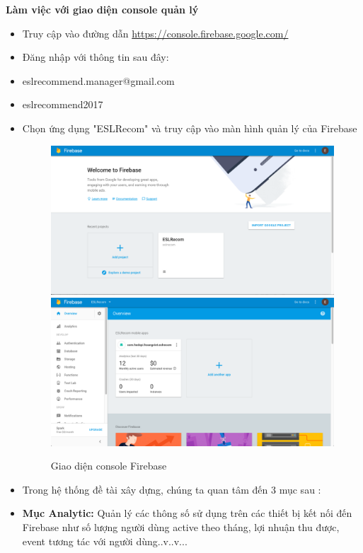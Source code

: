 {\Large \textbf{Làm việc với giao diện console quản lý}}
\begin{itemize}
	\item Truy cập vào đường dẫn \url{https://console.firebase.google.com/}
	\item Đăng nhập với thông tin sau đây:
	\item [] eslrecommend.manager@gmail.com
	\item [] eslrecommend2017
	\item Chọn ứng dụng "ESLRecom" và truy cập vào màn hình quản lý của Firebase  
\begin{figure}[H]
  \begin{center}
    \includegraphics[scale=0.33]{afterlogin}
    \vskip 0.1in
	\includegraphics[scale=0.33]{consoledashboard}
    \caption{Giao diện console Firebase}
    \label{FirebaseAfterLogin}
  \end{center}
\end{figure}
	\item [] Trong hệ thống đề tài xây dựng, chúng ta quan tâm đến 3 mục sau :
	\item \textbf{Mục Analytic: }Quản lý các thông số sử dụng trên các thiết bị kết nối đến Firebase như số lượng người dùng active theo tháng, lợi nhuận thu được, event tương tác với người dùng..v..v... 

\end{itemize}
